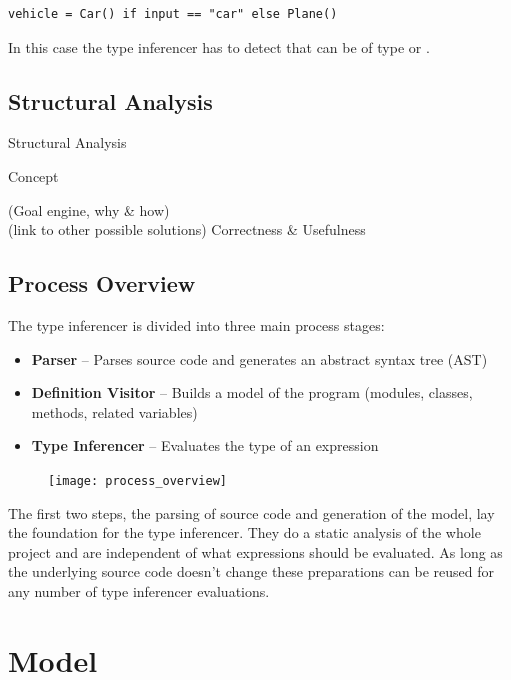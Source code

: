 \documentclass[12pt,halfparskip,DIV11,BCOR10mm]{scrreprt}
\begin{document}
\begin{lstlisting}
vehicle = Car() if input == "car" else Plane()
\end{lstlisting}

In this case the type inferencer has to detect that  can be of type  or .

\section{Structural Analysis}

Structural Analysis

{Concept}

(Goal engine, why \& how) \\
(link to other possible solutions)
Correctness \& Usefulness


\section{Process Overview}

The type inferencer is divided into three main process stages:

\begin{itemize}
    \item \textbf{Parser} – Parses source code and generates an abstract syntax tree (AST)
    \item \textbf{Definition Visitor} – Builds a model of the program (modules, classes, methods, related variables)
    \item \textbf{Type Inferencer} – Evaluates the type of an expression
\end{itemize}

\begin{figure}[h!]
 \centering
 \texttt{[image: process\_overview]}
 \label{fig:process_overview}
\end{figure}

The first two steps, the parsing of source code and generation of the model, lay the foundation for the type inferencer. They do a static analysis of the whole project and are independent of what expressions should be evaluated. As long as the underlying source code doesn't change these preparations can be reused for any number of type inferencer evaluations.

\chapter{Model}
\end{document}
